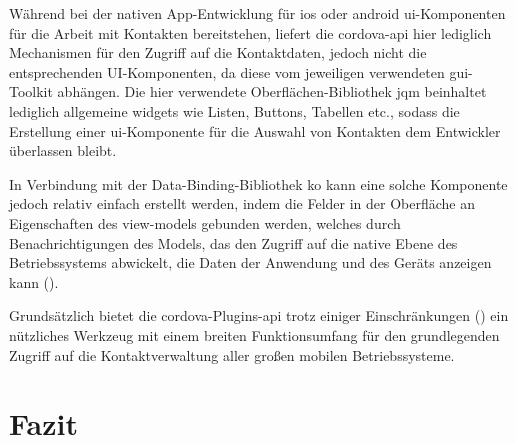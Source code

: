 Während bei der nativen App-Entwicklung für \gls{ios} oder \gls{android} \gls{ui}-Kom\-po\-nen\-ten für die Arbeit mit Kontakten bereitstehen, liefert die \gls{cordova}-\gls{api} hier lediglich Mechanismen für den Zugriff auf die Kontaktdaten, jedoch nicht die entsprechenden UI-Komponenten, da diese vom jeweiligen verwendeten \gls{gui}-Toolkit abhängen.
Die hier verwendete Oberflächen-Bibliothek \gls{jqm} beinhaltet lediglich allgemeine \glspl{widget} wie Listen, Buttons, Tabellen etc., sodass die Erstellung einer \gls{ui}-Komponente für die Auswahl von Kontakten dem Entwickler überlassen bleibt.

In Verbindung mit der Data-Binding-Bibliothek \gls{ko} kann eine solche Komponente jedoch relativ einfach erstellt werden, indem die Felder in der Oberfläche an Eigenschaften des \glspl{view-model} gebunden werden, welches durch Benachrichtigungen des Models, das den Zugriff auf die native Ebene des Betriebssystems abwickelt, die Daten der Anwendung und des Geräts anzeigen kann ().

Grundsätzlich bietet die \gls{cordova}-Plugins-\gls{api} trotz einiger Einschränkungen (\so) ein nützliches Werkzeug mit einem breiten Funktionsumfang für den grundlegenden Zugriff auf die Kontaktverwaltung aller großen mobilen Betriebssysteme.



\chapter{Fazit} %
